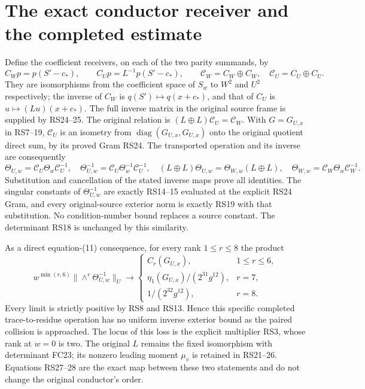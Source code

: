 \documentclass[11pt]{article}
\newcommand{\diag}{\operatorname{diag}}
\begin{document}
\section{The exact conductor receiver and the completed estimate}
Define the coefficient receivers, on each of the two parity
summands, by
\begin{equation}
 C_Wp=p(S'-c_*),\qquad C_Up=L^{-1}p(S'-c_*),\qquad
 \mathcal C_W=C_W\oplus C_W,\quad
 \mathcal C_U=C_U\oplus C_U.
 \tag{RS27}
\end{equation}
They are isomorphisms from the coefficient space of $S_w$
to $W^2$ and $U^2$ respectively; the inverse of $C_W$ is
$q(S')\mapsto q(x+c_*)$, and that of $C_U$ is
$u\mapsto (Lu)(x+c_*)$. The full inverse matrix in the original
source frame is supplied by RS24--25. The original relation is
$(L\oplus L)\mathcal C_U=\mathcal C_W$.
With $G=G_{U,x}$ in RS7--19, $\mathcal C_U$ is an isometry
from $\diag(G_{U,x},G_{U,x})$ onto the original quotient direct sum,
by its proved Gram RS24. The transported operation and its
inverse are consequently
\begin{equation}
 \Theta_{U,w}=\mathcal C_U\Theta_w\mathcal C_U^{-1},\quad
 \Theta_{U,w}^{-1}=\mathcal C_U\Theta_w^{-1}\mathcal C_U^{-1},\quad
 (L\oplus L)\Theta_{U,w}=\Theta_{W,w}(L\oplus L),
 \quad\Theta_{W,w}=\mathcal C_W\Theta_w\mathcal C_W^{-1}.
 \tag{RS28}
\end{equation}
Substitution and cancellation of the stated inverse maps prove
all identities. The singular constants of $\Theta_{U,w}^{-1}$
are exactly RS14--15 evaluated at the explicit RS24 Gram,
and every original-source exterior norm is exactly RS19 with
that substitution. No condition-number bound replaces a source
constant. The determinant RS18 is unchanged by this similarity.

As a direct equation-(11) consequence, for every rank $1\le r\le8$
the product
\begin{equation}
 w^{\min(r,6)}\|\wedge^r\Theta_{U,w}^{-1}\|_U
 \longrightarrow
 \begin{cases}
 C_r(G_{U,x}),&1\le r\le6,\\
 \eta_1(G_{U,x})/(2^{31}g^{12}),&r=7,\\
 1/(2^{32}g^{12}),&r=8.
 \end{cases}
 \tag{RS29}
\end{equation}
Every limit is strictly positive by RS8 and RS13. Hence this
specific completed trace-to-residue operation has no uniform
inverse exterior bound as the paired collision is approached.
The locus of this loss is the explicit multiplier RS3, whose
rank at $w=0$ is two. The original $L$ remains the fixed
isomorphism with determinant FC23; its nonzero leading moment
$\mu_v$ is retained in RS21--26. Equations RS27--28 are the exact
map between these two statements and do not change the original
conductor's order.
\end{document}
